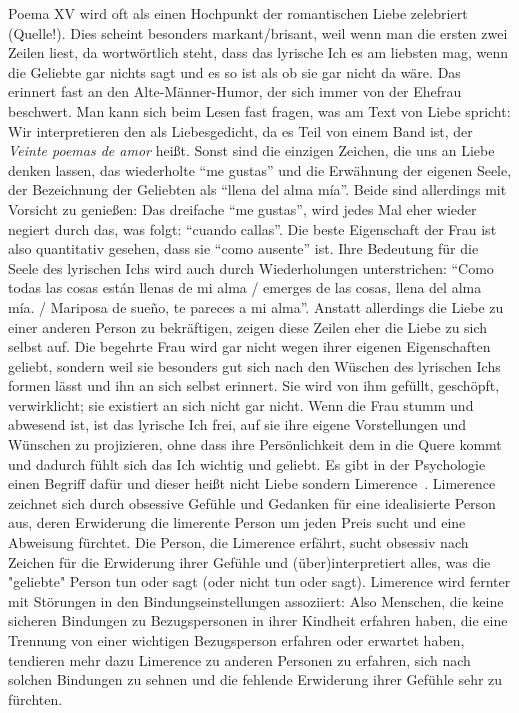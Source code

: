 Poema XV wird oft als einen Hochpunkt der romantischen Liebe zelebriert (Quelle!).
Dies scheint besonders markant/brisant, weil wenn man die ersten zwei Zeilen liest, da wortwörtlich steht, dass das lyrische Ich es am liebsten mag, wenn die Geliebte gar nichts sagt und es so ist als ob sie gar nicht da wäre.
Das erinnert fast an den Alte-Männer-Humor, der sich immer von der Ehefrau beschwert.
Man kann sich beim Lesen fast fragen, was am Text von Liebe spricht:
Wir interpretieren den als Liebesgedicht, da es Teil von einem Band ist, der \textit{Veinte poemas de amor} heißt.
Sonst sind die einzigen Zeichen, die uns an Liebe denken lassen, das wiederholte ``me gustas'' und die Erwähnung der eigenen Seele, der Bezeichnung der Geliebten als ``llena del alma mía''.
Beide sind allerdings mit Vorsicht zu genießen:
Das dreifache ``me gustas'', wird jedes Mal eher wieder negiert durch das, was folgt: ``cuando callas''.
Die beste Eigenschaft der Frau ist also quantitativ gesehen, dass sie ``como ausente'' ist.
Ihre Bedeutung für die Seele des lyrischen Ichs wird auch durch Wiederholungen unterstrichen: ``Como todas las cosas están llenas de mi alma / emerges de las cosas, llena del alma mía. / Mariposa de sueño, te pareces a mi alma''.
Anstatt allerdings die Liebe zu einer anderen Person zu bekräftigen, zeigen diese Zeilen eher die Liebe zu sich selbst auf.
Die begehrte Frau wird gar nicht wegen ihrer eigenen Eigenschaften geliebt, sondern weil sie besonders gut sich nach den Wüschen des lyrischen Ichs formen lässt und ihn an sich selbst erinnert.
Sie wird von ihm gefüllt, geschöpft, verwirklicht; sie existiert an sich nicht gar nicht.
Wenn die Frau stumm und abwesend ist, ist das lyrische Ich frei, auf sie ihre eigene Vorstellungen und Wünschen zu projizieren, ohne dass ihre Persönlichkeit dem in die Quere kommt und dadurch fühlt sich das Ich wichtig und geliebt. %
Es gibt in der Psychologie einen Begriff dafür und dieser heißt nicht Liebe sondern Limerence~\cite{WillBent2015}.
Limerence zeichnet sich durch obsessive Gefühle und Gedanken für eine idealisierte Person aus, deren Erwiderung die limerente Person um jeden Preis sucht und eine Abweisung fürchtet.
Die Person, die Limerence erfährt, sucht obsessiv nach Zeichen für die Erwiderung ihrer Gefühle und (über)interpretiert alles, was die "geliebte" Person tun oder sagt (oder nicht tun oder sagt).
Limerence wird fernter mit Störungen in den Bindungseinstellungen assoziiert:
Also Menschen, die keine sicheren Bindungen zu Bezugspersonen in ihrer Kindheit erfahren haben, die eine Trennung von einer wichtigen Bezugsperson erfahren oder erwartet haben, tendieren mehr dazu Limerence zu anderen Personen zu erfahren, sich nach solchen Bindungen zu sehnen und die fehlende Erwiderung ihrer Gefühle sehr zu fürchten.
